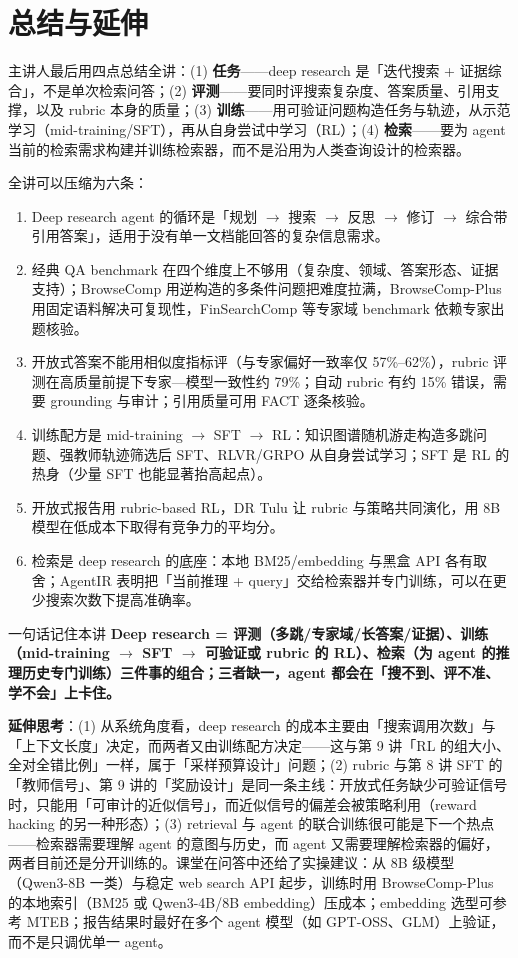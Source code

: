 \documentclass[a4paper]{article}
\begin{document}
\section{总结与延伸}

主讲人最后用四点总结全讲：(1) \textbf{任务}——deep research 是「迭代搜索 + 证据综合」，不是单次检索问答；(2) \textbf{评测}——要同时评搜索复杂度、答案质量、引用支撑，以及 rubric 本身的质量；(3) \textbf{训练}——用可验证问题构造任务与轨迹，从示范学习（mid-training/SFT），再从自身尝试中学习（RL）；(4) \textbf{检索}——要为 agent 当前的检索需求构建并训练检索器，而不是沿用为人类查询设计的检索器。

全讲可以压缩为六条：

\begin{enumerate}
\item Deep research agent 的循环是「规划 $\rightarrow$ 搜索 $\rightarrow$ 反思 $\rightarrow$ 修订 $\rightarrow$ 综合带引用答案」，适用于没有单一文档能回答的复杂信息需求。
\item 经典 QA benchmark 在四个维度上不够用（复杂度、领域、答案形态、证据支持）；BrowseComp 用逆构造的多条件问题把难度拉满，BrowseComp-Plus 用固定语料解决可复现性，FinSearchComp 等专家域 benchmark 依赖专家出题核验。
\item 开放式答案不能用相似度指标评（与专家偏好一致率仅 57\%--62\%），rubric 评测在高质量前提下专家—模型一致性约 79\%；自动 rubric 有约 15\% 错误，需要 grounding 与审计；引用质量可用 FACT 逐条核验。
\item 训练配方是 mid-training $\rightarrow$ SFT $\rightarrow$ RL：知识图谱随机游走构造多跳问题、强教师轨迹筛选后 SFT、RLVR/GRPO 从自身尝试学习；SFT 是 RL 的热身（少量 SFT 也能显著抬高起点）。
\item 开放式报告用 rubric-based RL，DR Tulu 让 rubric 与策略共同演化，用 8B 模型在低成本下取得有竞争力的平均分。
\item 检索是 deep research 的底座：本地 BM25/embedding 与黑盒 API 各有取舍；AgentIR 表明把「当前推理 + query」交给检索器并专门训练，可以在更少搜索次数下提高准确率。
\end{enumerate}

\begin{importantbox}{一句话记住本讲}
\textbf{Deep research = 评测（多跳/专家域/长答案/证据）、训练（mid-training $\rightarrow$ SFT $\rightarrow$ 可验证或 rubric 的 RL）、检索（为 agent 的推理历史专门训练）三件事的组合；三者缺一，agent 都会在「搜不到、评不准、学不会」上卡住。}
\end{importantbox}

\textbf{延伸思考}：(1) 从系统角度看，deep research 的成本主要由「搜索调用次数」与「上下文长度」决定，而两者又由训练配方决定——这与第 9 讲「RL 的组大小、全对全错比例」一样，属于「采样预算设计」问题；(2) rubric 与第 8 讲 SFT 的「教师信号」、第 9 讲的「奖励设计」是同一条主线：开放式任务缺少可验证信号时，只能用「可审计的近似信号」，而近似信号的偏差会被策略利用（reward hacking 的另一种形态）；(3) retrieval 与 agent 的联合训练很可能是下一个热点——检索器需要理解 agent 的意图与历史，而 agent 又需要理解检索器的偏好，两者目前还是分开训练的。课堂在问答中还给了实操建议：从 8B 级模型（Qwen3-8B 一类）与稳定 web search API 起步，训练时用 BrowseComp-Plus 的本地索引（BM25 或 Qwen3-4B/8B embedding）压成本；embedding 选型可参考 MTEB；报告结果时最好在多个 agent 模型（如 GPT-OSS、GLM）上验证，而不是只调优单一 agent。
\end{document}
